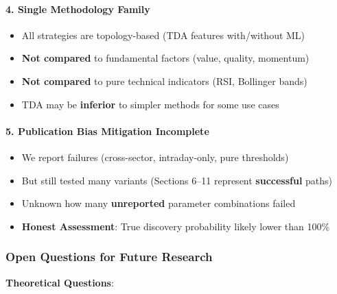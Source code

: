 \paragraph{4. Single Methodology Family}
\begin{itemize}
\item All strategies are topology-based (TDA features with/without ML)
\item \textbf{Not compared} to fundamental factors (value, quality, momentum)
\item \textbf{Not compared} to pure technical indicators (RSI, Bollinger bands)
\item TDA may be \textbf{inferior} to simpler methods for some use cases
\end{itemize}

\paragraph{5. Publication Bias Mitigation Incomplete}
\begin{itemize}
\item We report failures (cross-sector, intraday-only, pure thresholds)
\item But still tested many variants (Sections 6--11 represent \textbf{successful} paths)
\item Unknown how many \textbf{unreported} parameter combinations failed
\item \textbf{Honest Assessment}: True discovery probability likely lower than 100\%
\end{itemize}

\subsubsection{Open Questions for Future Research}

\textbf{Theoretical Questions}:

